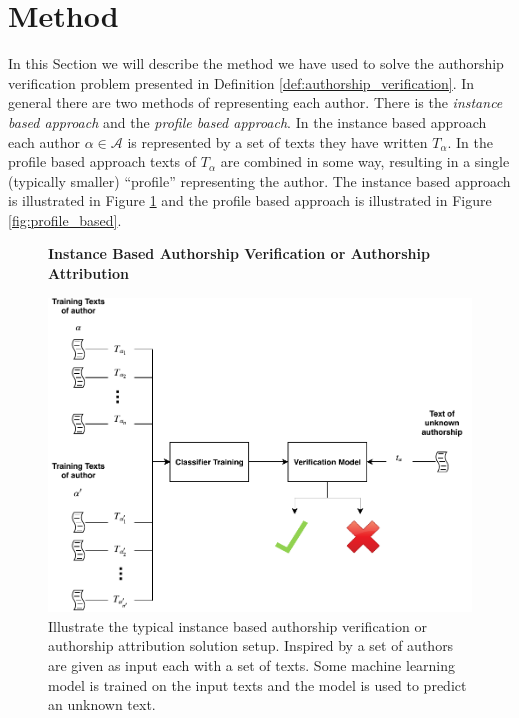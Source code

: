 \section{Method} \label{sec:method}

In this Section we will describe the method we have used to solve the authorship
verification problem presented in Definition \ref{def:authorship_verification}.
In general there are two methods of representing each author. There is the
\textit{instance based approach} and the \textit{profile based approach}. In
the instance based approach each author $\alpha \in \mathcal{A}$ is represented
by a set of texts they have written $T_\alpha$. In the profile based approach
texts of $T_\alpha$ are combined in some way, resulting in a single (typically
smaller) ``profile'' representing the author. The instance based approach is
illustrated in Figure \ref{fig:instance_based} and the profile based approach is
illustrated in Figure \ref{fig:profile_based}.

\begin{figure}[htb]
    \centering
    \textbf{Instance Based Authorship Verification or Authorship Attribution}\par\medskip
    \includegraphics[scale=0.5]{./pictures/method/instance_based}
    \caption{Illustrate the typical instance based authorship verification or
        authorship attribution solution setup. Inspired by \citet{stamatos2009}
        a set of authors are given as input each with a set of texts. Some
        machine learning model is trained on the input texts and the model is
        used to predict an unknown text.}
    \label{fig:instance_based}
\end{figure}

